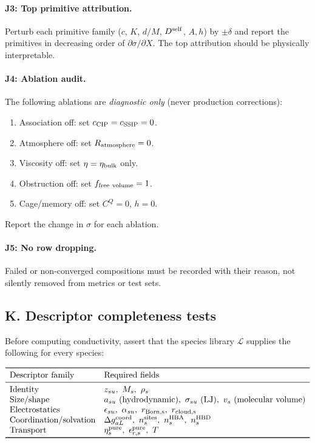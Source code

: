 \documentclass[11pt]{article}
\begin{document}
\paragraph{J3: Top primitive attribution.}
Perturb each primitive family (\(c\), \(K\), \(d/M\), \(D^{\rm self}\),
\(A,h\)) by \(\pm\delta\) and report the primitives in decreasing order of
\(\partial\sigma/\partial X\). The top attribution should be physically
interpretable.

\paragraph{J4: Ablation audit.}
The following ablations are \emph{diagnostic only} (never production corrections):
\begin{enumerate}
\item Association off: set \(c_{\rm CIP}=c_{\rm SSIP}=0\).
\item Atmosphere off: set \(R_{\rm atmosphere}=0\).
\item Viscosity off: set \(\eta=\eta_{\rm bulk}\) only.
\item Obstruction off: set \(f_{\rm free\ volume}=1\).
\item Cage/memory off: set \(C^Q=0\), \(h=0\).
\end{enumerate}
Report the change in \(\sigma\) for each ablation.

\paragraph{J5: No row dropping.}
Failed or non-converged compositions must be recorded with their reason,
not silently removed from metrics or test sets.

\subsection{K. Descriptor completeness tests}

Before computing conductivity, assert that the species library \(\mathcal L\)
supplies the following for every species:

\[
\begin{array}{ll}
\toprule
\text{Descriptor family} & \text{Required fields} \\
\midrule
\text{Identity} & z_{su},\ M_s,\ \rho_s \\
\text{Size/shape} & a_{su}\ (\text{hydrodynamic}),\ \sigma_{su}\ (\text{LJ}),\
v_s\ (\text{molecular volume}) \\
\text{Electrostatics} & \epsilon_{su},\ \alpha_{su},\ r_{\rm Born,s},\
r_{\rm cloud,s} \\
\text{Coordination/solvation} & \Delta g_{aL}^{\rm coord},\ n_s^{\rm sites},\
n_s^{\rm HBA},\ n_s^{\rm HBD} \\
\text{Transport} & \eta_s^{\rm pure},\ \epsilon_{r,s}^{\rm pure},\ T \\
\bottomrule
\end{array}
\]
\end{document}
